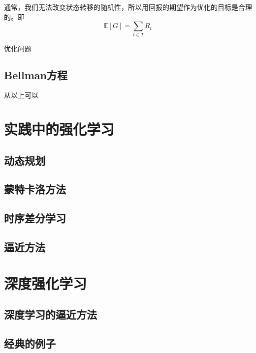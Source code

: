 通常，我们无法改变状态转移的随机性，所以用回报的期望作为优化的目标是合理的。即
\begin{equation}
    \mathbb{E} [G] = \sum_{t \in T} R_t
\end{equation}


优化问题



\subsection{Bellman方程}
从以上可以



\section{实践中的强化学习}


\subsection{动态规划}


\subsection{蒙特卡洛方法}


\subsection{时序差分学习}

\subsection{逼近方法}

\section{深度强化学习}

\subsection{深度学习的逼近方法}

\subsection{经典的例子}


